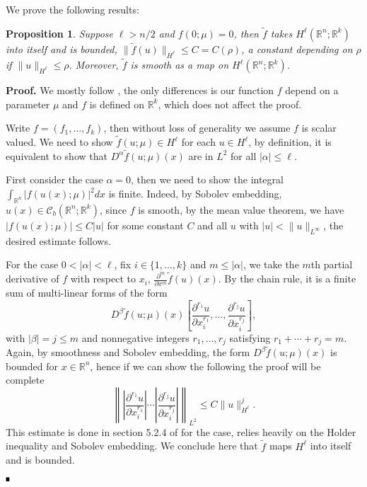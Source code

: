 \documentclass[letterpaper,11pt]{article}
\newcommand{\R}{\mathbb{R}}
\numberwithin{equation}{section}
\theoremstyle{plain}
\newtheorem{proposition}[theorem]{Proposition}
\theoremstyle{remark}
\newenvironment{Proof}[1][.]%
 {\begin{trivlist}\item[]\textbf{Proof#1 }}%
 {\hspace*{\fill}$\rule{0.3\baselineskip}{0.35\baselineskip}$\end{trivlist}}
\begin{document}
We prove the following results:
\begin{proposition}\label{spHest}
Suppose $\ell > n/2$ and $f(0;\mu)=0$, then $\tilde{f}$ takes $H^\ell(\R^n;\R^k)$ into itself and is bounded, $\|\tilde{f}(u)\|_{H^\ell} \le C=C(\rho)$, a constant depending on $\rho$ if $\|u\|_{H^\ell} \le \rho$. Moreover, $\tilde{f}$ is smooth as a map on $H^\ell(\R^n;\R^k)$.
\end{proposition}
\begin{Proof}We mostly follow \cite{runst1996sobolev}, the only differences is our function $f$ depend on a parameter $\mu$ and $f$ is defined on $\R^k$, which does not affect the proof.

Write $f=(f_1,\ldots,f_k)$, then without loss of generality we assume $f$ is scalar valued. We need to show $\tilde{f}(u;\mu)\in H^\ell$ for each $u \in H^\ell$, by definition, it is equivalent to show that $D^\alpha \tilde{f}(u;\mu) (x)$ are in $L^2$ for all $ |\alpha|\le \ell$.

First consider the case $\alpha = 0$, then we need to show the integral $\int_{\R^n} |f(u(x);\mu)|^2 dx
$ is finite. Indeed, by Sobolev embedding, $u(x) \in \mathscr{C}_b(\R^n;\R^k)$, since $f$ is smooth, by the mean value theorem, we have $|f(u(x);\mu)| \le C|u|$ for some constant $C$ and all $u$ with $|u|<\|u\|_{L^\infty}$, the desired estimate follows.

For the case $0<|\alpha|<\ell$, fix $i\in \{1,\ldots,k\}$ and $m\le |\alpha|$, we take the $m$th partial derivative of $f$ with respect to $x_i$, $\frac{\partial^m}{\partial x^m}\tilde{f}(u)(x)$. By the chain rule, it is a finite sum of multi-linear forms of the form
\[
D^\beta \tilde{f}(u;\mu) (x) \left[ \frac{\partial^{r_1}u}{\partial x_i^{r_1}},\ldots,\frac{\partial^{r_j}u}{\partial x_i^{r_j}} \right], 
\]
with $|\beta|=j \le m$ and nonnegative integers $r_1,\ldots,r_j$ satisfying $r_1+\cdots+r_j = m$. Again, by smoothness and Sobolev embedding, the form $D^\beta \tilde{f}(u;\mu)(x)$ is bounded for $x\in \R^n$, hence if we can show the following the proof will be complete
\[
\left\| \left|\frac{\partial^{r_1}u}{\partial x_i^{r_1}}\right| \cdots \left|\frac{\partial^{r_j}u}{\partial x_i^{r_j}}\right| \right\|_{L^2} \le C\|u\|_{H^\ell}^j.
\]
This estimate is done in section 5.2.4 of \cite{runst1996sobolev} for the case, relies heavily on the Holder inequality and Sobolev embedding. We conclude here that $\tilde{f}$ maps $H^\ell$ into itself and is bounded.


\end{Proof}
\end{document}
